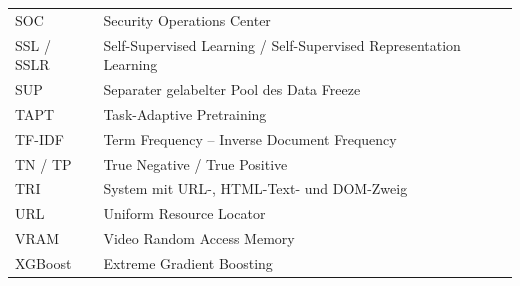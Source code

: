 \begin{longtable}{@{}p{}p{}@{}}
SOC & Security Operations Center\\
SSL / SSLR & Self-Supervised Learning / Self-Supervised Representation Learning\\
SUP & Separater gelabelter Pool des Data Freeze\\
TAPT & Task-Adaptive Pretraining\\
TF-IDF & Term Frequency -- Inverse Document Frequency\\
TN / TP & True Negative / True Positive\\
TRI & System mit URL-, HTML-Text- und DOM-Zweig\\
URL & Uniform Resource Locator\\
VRAM & Video Random Access Memory\\
XGBoost & Extreme Gradient Boosting\\
\end{longtable}
\endgroup
